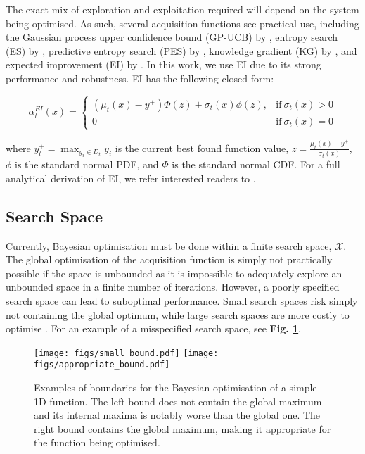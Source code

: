 \documentclass[preprint]{elsarticle}
\begin{document}
The exact mix of exploration and exploitation required will depend on the system being optimised. As such, several acquisition functions see practical use, including the Gaussian process upper confidence bound (GP-UCB) by \cite{srinivas2010}, entropy search (ES) by \cite{hennig2012entropy}, predictive entropy search (PES) by \cite{hernandez2014predictive}, knowledge gradient (KG) by \cite{scott2011correlated}, and expected improvement (EI) by \cite{jones1998efficient}. In this work, we use EI due to its strong performance and robustness. EI has the following closed form:
\begin{linenomath*}
\begin{equation}
\alpha_t^{EI}(x)=\begin{cases}
(\mu_t(x)-y^{+})\Phi(z)+\sigma_t(x)\phi(z), & \mathrm{if}\:\sigma_t(x)>0\\
0 & \mathrm{if}\:\sigma_t(x)=0
\end{cases}
\end{equation}
\end{linenomath*}
where $y_t^+=\max_{y_i \in D_t}{y_i}$ is the current best found function value, $z=\frac{\mu_t(x)-y^{+}}{\sigma_t(x)}$, $\phi$ is the standard
normal PDF, and $\Phi$ is the standard normal CDF. For a full analytical derivation of EI, we refer interested readers to \cite{nguyen2017regret}.

\subsection{Search Space}
Currently, Bayesian optimisation must be done within a finite search space, $\mathcal{X}$. The global optimisation of the acquisition function is simply not practically possible if the space is unbounded as it is impossible to adequately explore an unbounded space in a finite number of iterations. However, a poorly specified search space can lead to suboptimal performance. Small search spaces risk simply not containing the global optimum, while large search spaces are more costly to optimise \citep{nguyen2017bayesian}. For an example of a misspecified search space, see \textbf{ Fig. \ref{fig:SS_example}}.

\begin{figure}[h]
\centering
\texttt{[image: figs/small\_bound.pdf]}
\texttt{[image: figs/appropriate\_bound.pdf]}
\caption{Examples of boundaries for the Bayesian optimisation of a simple 1D function. The left bound does not contain the global maximum and its internal maxima is notably worse than the global one. The right bound contains the global maximum, making it appropriate for the function being optimised.}
\label{fig:SS_example}
\end{figure}
\end{document}
